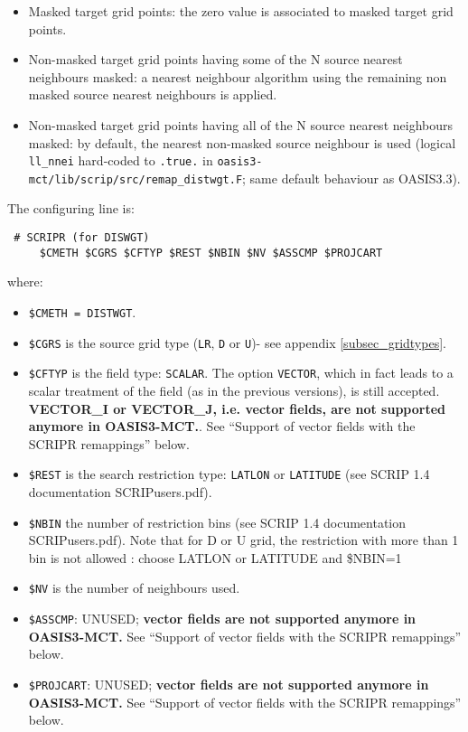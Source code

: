 \begin{itemize}
\begin{itemize}
    \begin{itemize}

    \item Masked target grid points: the zero value is associated to
      masked target grid points.

    \item Non-masked target grid points having some of the N source
      nearest neighbours masked: a nearest neighbour algorithm using
      the remaining non masked source nearest neighbours is applied.

    \item Non-masked target grid points having all of the N source
      nearest neighbours masked: by default, the nearest non-masked
      source neighbour is used (logical {\tt ll\_nnei} hard-coded to
      {\tt .true.} in {\tt oasis3-mct/lib/scrip/src/remap\_distwgt.F};
      same default behaviour as OASIS3.3).

    \end{itemize}

    The configuring line is:

  \begin{verbatim}
 # SCRIPR (for DISWGT) 
     $CMETH $CGRS $CFTYP $REST $NBIN $NV $ASSCMP $PROJCART
\end{verbatim} 
    where:
    \begin{itemize}
    \item {\tt \$CMETH = DISTWGT}.
    \item {\tt \$CGRS} is the source grid type ({\tt LR}, {\tt D} or
      {\tt U})- see appendix \ref{subsec_gridtypes}.

    \item {\tt \$CFTYP} is the field type: {\tt SCALAR}. The option
      {\tt VECTOR}, which in fact leads to a scalar treatment of the
      field (as in the previous versions), is still accepted. {\bf
        VECTOR\_I or VECTOR\_J, i.e. vector fields, are not supported
        anymore in OASIS3-MCT.}. See ``Support of vector fields with
      the SCRIPR remappings'' below.

    \item {\tt \$REST} is the search restriction type: {\tt LATLON} or
      {\tt LATITUDE} (see SCRIP 1.4 documentation SCRIPusers.pdf).
    \item {\tt \$NBIN} the number of restriction bins (see SCRIP 1.4
      documentation SCRIPusers.pdf). Note that for D or U grid, the
      restriction with more than 1 bin is not allowed : choose LATLON or
      LATITUDE and \$NBIN=1
    \item {\tt \$NV} is the number of neighbours used.
    \item {\tt \$ASSCMP}: UNUSED; {\bf vector fields are not supported
        anymore in OASIS3-MCT.} See ``Support of vector fields with
      the SCRIPR remappings'' below.
    \item {\tt \$PROJCART}: UNUSED; {\bf vector fields are not
        supported anymore in OASIS3-MCT.} See ``Support of vector
      fields with the SCRIPR remappings'' below.
    \end{itemize}


\end{itemize}
\end{itemize}

